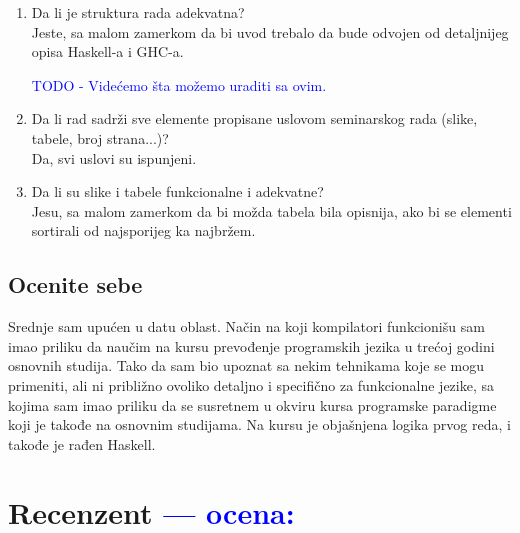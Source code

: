 \documentclass[a4paper]{report}
\newcommand{\odgovor}[1]{\textcolor{blue}{#1}}
\begin{document}
\begin{enumerate}
		\item Da li je struktura rada adekvatna?\\
		Jeste, sa malom zamerkom da bi uvod trebalo da bude odvojen od detaljnijeg opisa Haskell-a i GHC-a.
		
		\odgovor{TODO - Videćemo šta možemo uraditi sa ovim.}
		
		\item Da li rad sadrži sve elemente propisane uslovom seminarskog rada (slike, tabele, broj strana...)?\\
		Da, svi uslovi su ispunjeni.
		
		\item Da li su slike i tabele funkcionalne i adekvatne?\\
		Jesu, sa malom zamerkom da bi možda tabela bila opisnija, ako bi se elementi sortirali od najsporijeg ka najbržem.
		
	\end{enumerate}
	
	\section{Ocenite sebe}
	
	Srednje sam upućen u datu oblast. Način na koji kompilatori funkcionišu sam imao priliku da naučim na kursu prevođenje programskih jezika u trećoj godini osnovnih studija. Tako da sam bio upoznat sa nekim tehnikama koje se mogu primeniti, ali ni približno ovoliko detaljno i specifično za funkcionalne jezike, sa kojima sam imao priliku da se susretnem u okviru kursa programske paradigme koji je takođe na osnovnim studijama. Na kursu je objašnjena logika prvog reda, i takođe je rađen Haskell.
	
	\chapter{Recenzent \odgovor{--- ocena:} }
	
	
\end{document}
